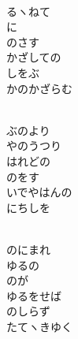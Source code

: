 \documentclass[10pt,b5j]{tarticle} %
\begin{document}
\vspace{1.5em} %
\newcommand{\linespace}{0.5em} %
\newcommand{\blocksize}{0.5\hsize} %
\newcommand{\itemmargin}{3em} %
\begin{enumerate} %
    \setlength{\itemindent}{\itemmargin} %
    \begin{minipage}[c]{\blocksize}
    
        \vspace{\linespace}
        \item~\\
        るヽねて\\
        に\\
        のさす\\
        かざしての\\
        しをぶ\\
        かのかざらむ
        
    \end{minipage}
    \begin{minipage}[c]{\blocksize}
        
        \vspace{\linespace}
        \item~\\
        ぶのより\\
        やのうつり\\
        はれどの\\
        のをす\\
        いでやはんの\\
        にちしを
        
    \end{minipage}
    \begin{minipage}[c]{\blocksize}
        
        \vspace{\linespace}
        \item~\\
        のにまれ\\
        ゆるの\\
        のが\\
        ゆるをせば\\
        のしらず\\
        たてヽきゆく
        

\end{minipage}
\end{enumerate}
\end{document}
